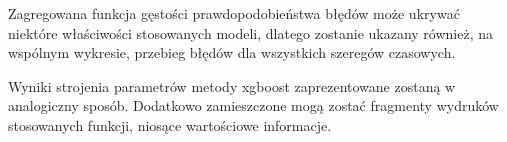 \documentclass[11pt]{report}
\begin{document}
Zagregowana funkcja gęstości prawdopodobieństwa błędów może ukrywać niektóre właściwości stosowanych modeli, dlatego zostanie ukazany również, na wspólnym  wykresie, przebieg błędów dla wszystkich szeregów czasowych.

Wyniki strojenia parametrów metody xgboost zaprezentowane zostaną w analogiczny sposób.
Dodatkowo zamieszczone mogą zostać fragmenty wydruków stosowanych funkcji, niosące wartościowe informacje.




\begin{figure}
    \centering
    \def\svgwidth{\columnwidth}
    
\end{figure}
\end{document}
